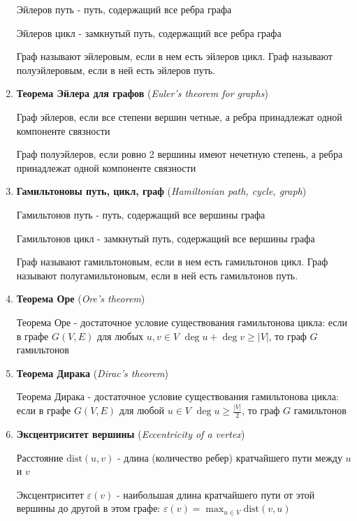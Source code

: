 \documentclass[12pt]{article}
\begin{document}
\begin{enumerate}
        Эйлеров путь - путь, содержащий все ребра графа

        Эйлеров цикл - замкнутый путь, содержащий все ребра графа

        Граф называют эйлеровым, если в нем есть эйлеров цикл. Граф называют полуэйлеровым, если в ней есть эйлеров путь.

        \item \textbf{Теорема Эйлера для графов} (\textit{Euler's theorem for graphs})

        Граф эйлеров, если все степени вершин четные, а ребра принадлежат одной компоненте связности

        Граф полуэйлеров, если ровно 2 вершины имеют нечетную степень, а ребра принадлежат одной компоненте связности

        \item \textbf{Гамильтоновы путь, цикл, граф} (\textit{Hamiltonian path, cycle, graph})

        Гамильтонов путь - путь, содержащий все вершины графа

        Гамильтонов цикл - замкнутый путь, содержащий все вершины графа

        Граф называют гамильтоновым, если в нем есть гамильтонов цикл. Граф называют полугамильтоновым, если в ней есть гамильтонов путь.

        \item \textbf{Теорема Оре} (\textit{Ore’s theorem})

        Теорема Оре - достаточное условие существования гамильтонова цикла: если в графе $G(V, E)$ для любых $u, v \in V$ $\deg u + \deg v \geq |V|$, то граф $G$ гамильтонов

        \item \textbf{Теорема Дирака} (\textit{Dirac’s theorem})

        Теорема Дирака - достаточное условие существования гамильтонова цикла: если в графе $G(V, E)$ для любой $u \in V$ $\deg u \geq \frac{|V|}{2}$, то граф $G$ гамильтонов


        \item \textbf{Эксцентриситет вершины} (\textit{Eccentricity of a vertex})

        Расстояние $\text{dist}(u, v)$ - длина (количество ребер) кратчайшего пути между $u$ и $v$

        Эксцентриситет $\varepsilon(v)$ - наибольшая длина кратчайшего пути от этой вершины до другой в этом графе: $\varepsilon(v) = \max_{u \in V} \text{dist}(v, u)$


\end{enumerate}
\end{document}
